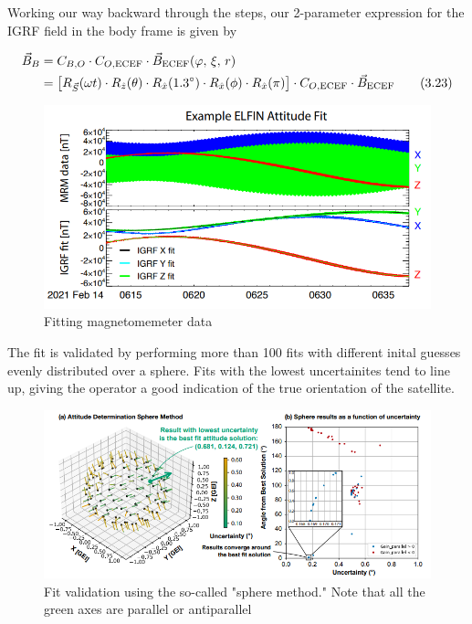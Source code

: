 \documentclass{article}
\begin{document}
Working our way backward through the steps, our 2-parameter expression for the IGRF field in the body frame is given by 

\begin{alignat}{1}
	\vec{B}_{B} &= C_{B,O} \cdot C_{O, \text{ECEF}} \cdot \vec{B}_{\text{ECEF}} (\varphi, \, \xi, \, r) \notag \\
	& = \left[ R_{\vec{S}}(\omega t) \cdot R_{\hat{z}}(\theta) \cdot R_{\hat{x}}(1.3 \degree) \cdot R_{\hat{x}}(\phi) \cdot R_{\hat{x}}(\pi) \right] \cdot C_{O,\text{ECEF}} \cdot \vec{B}_{\text{ECEF}} \tag{3.23}
\end{alignat}

\begin{figure}[H]
    \centering
    \includegraphics[width=1\textwidth]{IGRF Fit.png}
    \caption{Fitting magnetomemeter data \cite{tsai}}
    \label{fig:enter-label}
\end{figure}

The fit is validated by performing more than 100 fits with different inital guesses evenly distributed over a sphere. Fits with the lowest uncertainites tend to line up, giving the operator a good indication of the true orientation of the satellite.

\begin{figure}[H]
    \centering
    \includegraphics[width=1\textwidth]{IGRF Fit 2.png}
    \caption{Fit validation using the so-called "sphere method." Note that all the green axes are parallel or antiparallel \cite{tsai}}
    \label{fig:enter-label}
\end{figure}
\end{document}
